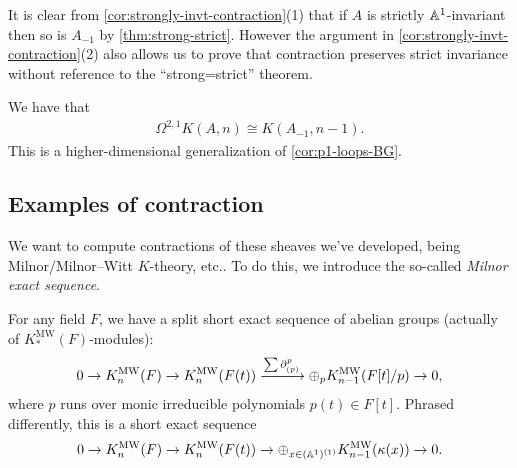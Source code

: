 \documentclass[11pt,openany]{book}
\let\del\partial
\providecommand{\MW}{\mathrm{MW}}
\begin{document}
\begin{remark} 
It is clear from \autoref{cor:strongly-invt-contraction}(1) that if $A$ is strictly $\mathbb{A}^1$-invariant then so is $A_{-1}$ by \autoref{thm:strong-strict}. However the argument in \autoref{cor:strongly-invt-contraction}(2) also allows us to prove that contraction preserves strict invariance without reference to the ``strong=strict'' theorem.
\end{remark}



\begin{corollary} We have that
\begin{align*}
    \Omega^{2,1} K(A,n) \cong K(A_{-1},n-1).
\end{align*}
This is a higher-dimensional generalization of \autoref{cor:p1-loops-BG}.
\end{corollary}

\subsection{Examples of contraction}

We want to compute contractions of these sheaves we've developed, being Milnor/Milnor--Witt $K$-theory, etc.. To do this, we introduce the so-called \textit{Milnor exact sequence}.

\begin{theorem} \cite[3.24]{Morel}
For any field $F$, we have a split short exact sequence of abelian groups (actually of $K_\ast^\MW(F)$-modules):
\begin{align*}
    0 \to K_n^\MW(F) \to K_n^\MW(F(t)) \xto{\sum \del^p_{(p)}} \oplus_p K_{n-1}^\MW(F[t]/p) \to 0,
\end{align*}
where $p$ runs over monic irreducible polynomials $p(t) \in F[t]$. Phrased differently, this is a short exact sequence
\begin{align*}
    0 \to K_n^\MW(F) \to K_n^\MW(F(t)) \to \oplus_{x\in(\A^1)^{(1)}} K_{n-1}^\MW(\kappa(x)) \to 0.
\end{align*}
\end{theorem}
\end{document}

